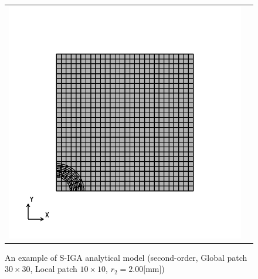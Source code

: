 \begin{figure}[hbtp]
\begin{tabular}{cc}
\begin{minipage}[t]{0.45\hsize}
      \includegraphics[keepaspectratio, scale=0.35]
      {fig/result_data_etc/s-iga04/model/2.00.png}
      \caption{An example of S-IGA analytical model (second-order, Global patch $30\times 30$, Local patch $10\times 10$, $r_2 = 2.00$[mm])}
      \label{fig:s-iga04 model 2.00}
    \end{minipage}
  \end{tabular}
\end{figure}

\newpage

